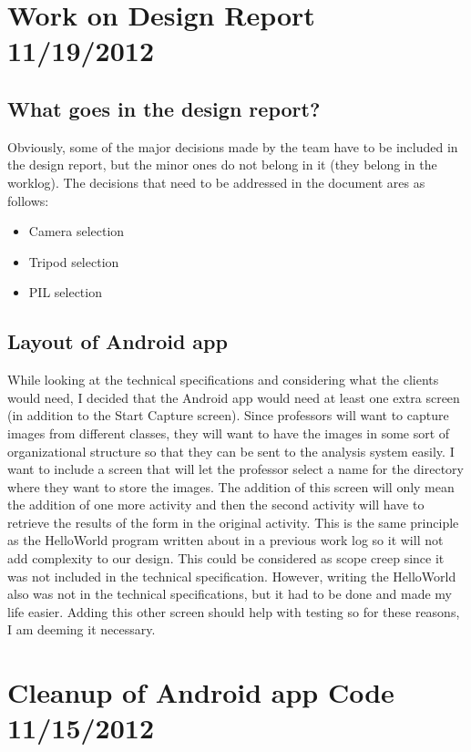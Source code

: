 \documentclass[]{article}
\begin{document}
	
	\section{Work on Design Report 11/19/2012}
		
		\subsection{What goes in the design report?}
			Obviously, some of the major decisions made by the team have to be included in the design report, but the minor ones do not belong in it (they belong in the worklog). The decisions that need to be addressed in the document ares as follows:
			\begin{itemize}
				\item Camera selection
				\item Tripod selection
				\item PIL selection
			\end{itemize}
			
			
		\subsection{Layout of Android app}
			While looking at the technical specifications and considering what the clients would need, I decided that the Android app would need at least one extra screen (in addition to the Start Capture screen). Since professors will want to capture images from different classes, they will want to have the images in some sort of organizational structure so that they can be sent to the analysis system easily. I want to include a screen that will let the professor select a name for the directory where they want to store the images. The addition of this screen will only mean the addition of one more activity and then the second activity will have to retrieve the results of the form in the original activity. This is the same principle as the HelloWorld program written about in a previous work log so it will not add complexity to our design. This could be considered as scope creep since it was not included in the technical specification. However, writing the HelloWorld also was not in the technical specifications, but it had to be done and made my life easier. Adding this other screen should help with testing so for these reasons, I am deeming it necessary.
	
	
	\section{Cleanup of Android app Code 11/15/2012}
		
\end{document}
